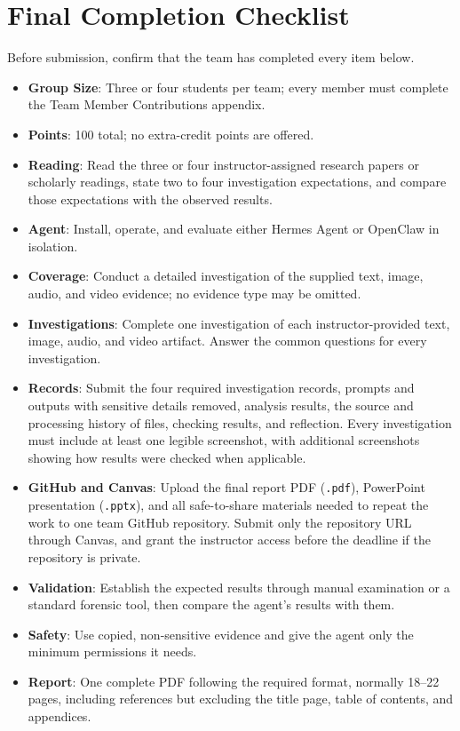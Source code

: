 \documentclass[12pt,letterpaper]{article}
\begin{document}
\section{Final Completion Checklist}
Before submission, confirm that the team has completed every item below.
\begin{itemize}
    \item \textbf{Group Size}: Three or four students per team; every member must complete the Team Member Contributions appendix.
    \item \textbf{Points}: 100 total; no extra-credit points are offered.
    \item \textbf{Reading}: Read the three or four instructor-assigned research papers or scholarly readings, state two to four investigation expectations, and compare those expectations with the observed results.
    \item \textbf{Agent}: Install, operate, and evaluate either Hermes Agent or OpenClaw in isolation.
    \item \textbf{Coverage}: Conduct a detailed investigation of the supplied text, image, audio, and video evidence; no evidence type may be omitted.
    \item \textbf{Investigations}: Complete one investigation of each instructor-provided text, image, audio, and video artifact. Answer the common questions for every investigation.
    \item \textbf{Records}: Submit the four required investigation records, prompts and outputs with sensitive details removed, analysis results, the source and processing history of files, checking results, and reflection. Every investigation must include at least one legible screenshot, with additional screenshots showing how results were checked when applicable.
    \item \textbf{GitHub and Canvas}: Upload the final report PDF (\texttt{.pdf}), PowerPoint presentation (\texttt{.pptx}), and all safe-to-share materials needed to repeat the work to one team GitHub repository. Submit only the repository URL through Canvas, and grant the instructor access before the deadline if the repository is private.
    \item \textbf{Validation}: Establish the expected results through manual examination or a standard forensic tool, then compare the agent's results with them.
    \item \textbf{Safety}: Use copied, non-sensitive evidence and give the agent only the minimum permissions it needs.
    \item \textbf{Report}: One complete PDF following the required format, normally 18--22 pages, including references but excluding the title page, table of contents, and appendices.

\end{itemize}
\end{document}
